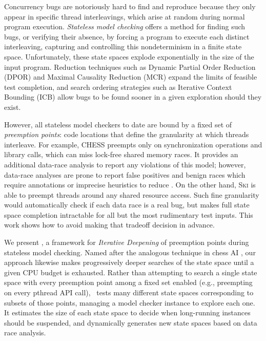 \documentclass[pldi]{sigplanconf-pldi15}
\begin{document}
Concurrency bugs are notoriously hard to find and reproduce because they only appear in specific thread interleavings, which arise at random during normal program execution.
{\em Stateless model checking} \cite{verisoft} offers a method for finding such bugs,
or verifying their absence,
by forcing a program to execute each distinct interleaving,
capturing and controlling this nondeterminism in a finite state space.
Unfortunately, these state spaces explode exponentially in the size of the input program.
Reduction techniques such as Dynamic Partial Order Reduction (DPOR) \cite{dpor} and Maximal Causality Reduction (MCR) \cite{mcr} expand the limits of feasible test completion,
and search ordering strategies such as Iterative Context Bounding (ICB) \cite{chess} allow bugs to be found sooner in a given exploration should they exist.

However, all stateless model checkers to date are bound by a fixed set of {\em preemption points}: code locations that define the granularity at which threads interleave.
For example, \textsc{CHESS} \cite{chess} preempts only on synchronization operations and library calls, which can miss lock-free shared memory races.
It provides an additional data-race analysis to report any violations of this model;
however, data-race analyses are prone to report false positives and benign races which require annotations or imprecise heuristics to reduce \cite{racerx,tsan,datacollider}.
%
On the other hand,
\textsc{Ski} \cite{ski}
is able to preempt threads around any shared resource access. Such fine granularity would automatically check if each data race is a real bug, but makes full state space completion intractable for all but the most rudimentary test inputs.
%
This work shows how to avoid making that tradeoff decision in advance.

We present \quicksand, a framework for {\em Iterative Deepening} of preemption points during stateless model checking.
Named after the analogous technique in chess AI \cite{iterative-deepening-chess}, our approach likewise makes progressively deeper searches of the state space until a given CPU budget is exhausted.
Rather than attempting to search a single state space with every preemption point among a fixed set enabled (e.g., preempting on every pthread API call),
\quicksand~tests many different state spaces corresponding to subsets of those points, managing a model checker instance to explore each one.
It estimates the size of each state space to decide when long-running instances should be suspended, and dynamically generates new state spaces based on data race analysis.
\end{document}
